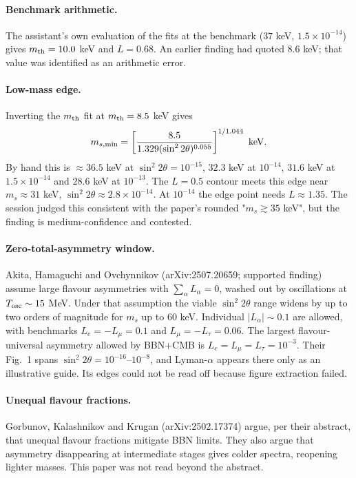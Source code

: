 \documentclass[11pt,a4paper]{article}
\begin{document}
\paragraph{Benchmark arithmetic.} The assistant's own evaluation of the fits at the benchmark ($37$ keV, $1.5\times10^{-14}$) gives $m_{\rm th}=10.0$ keV and $L=0.68$. An earlier finding had quoted 8.6 keV; that value was identified as an arithmetic error.

\paragraph{Low-mass edge.} Inverting the $m_{\rm th}$ fit at $m_{\rm th}=8.5$ keV gives
\begin{equation}
m_{s,\min}=\left[\frac{8.5}{1.329(\sin^2 2\theta)^{0.055}}\right]^{1/1.044}\ {\rm keV}.
\end{equation}
By hand this is $\approx36.5$ keV at $\sin^2 2\theta=10^{-15}$, $32.3$ keV at $10^{-14}$, $31.6$ keV at $1.5\times10^{-14}$ and $28.6$ keV at $10^{-13}$. The $L=0.5$ contour meets this edge near $m_s\approx31$ keV, $\sin^2 2\theta\approx2.8\times10^{-14}$. At $10^{-14}$ the edge point needs $L\approx1.35$. The session judged this consistent with the paper's rounded "$m_s\gtrsim35$ keV", but the finding is medium-confidence and contested.

\paragraph{Zero-total-asymmetry window.} Akita, Hamaguchi and Ovchynnikov (arXiv:2507.20659; supported finding) assume large flavour asymmetries with $\sum_\alpha L_\alpha=0$, washed out by oscillations at $T_{\rm osc}\sim15$ MeV. Under that assumption the viable $\sin^2 2\theta$ range widens by up to two orders of magnitude for $m_s$ up to 60 keV. Individual $|L_\alpha|\sim0.1$ are allowed, with benchmarks $L_e=-L_\mu=0.1$ and $L_\mu=-L_\tau=0.06$. The largest flavour-universal asymmetry allowed by BBN+CMB is $L_e=L_\mu=L_\tau=10^{-3}$. Their Fig.~1 spans $\sin^2 2\theta=10^{-16}$--$10^{-8}$, and Lyman-$\alpha$ appears there only as an illustrative guide. Its edges could not be read off because figure extraction failed.

\paragraph{Unequal flavour fractions.} Gorbunov, Kalashnikov and Krugan (arXiv:2502.17374) argue, per their abstract, that unequal flavour fractions mitigate BBN limits. They also argue that asymmetry disappearing at intermediate stages gives colder spectra, reopening lighter masses. This paper was not read beyond the abstract.
\end{document}
